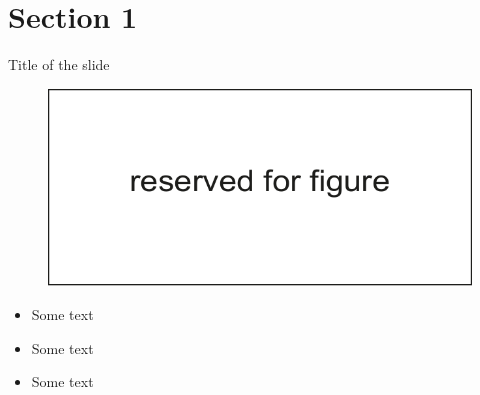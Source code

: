 \documentclass[russian,12pt,aspectratio=169,xcolor=table]{beamer}
\begin{document}
\section{Section 1}

\begin{frame}{Title of the slide}
\qquad
  \begin{minipage}{.42\textwidth}
    \begin{figure}
      \centering
      \includegraphics[scale=0.6]{img/3}
    \end{figure}
  \end{minipage} \hfill
  \begin{minipage}{.45\textwidth}
    \begin{itemize}
      \item Some text
      \item Some text
      \item Some text
    \end{itemize}
  \end{minipage}
\end{frame}
\end{document}
